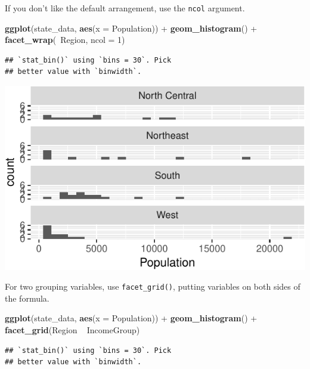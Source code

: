 \documentclass[12pt,oneside,openany]{tufte-book}
\newenvironment{Shaded}{}{}
\newcommand{\KeywordTok}[1]{\textcolor[rgb]{0.00,0.44,0.13}{\textbf{{#1}}}}
\newcommand{\DataTypeTok}[1]{\textcolor[rgb]{0.56,0.13,0.00}{{#1}}}
\newcommand{\DecValTok}[1]{\textcolor[rgb]{0.25,0.63,0.44}{{#1}}}
\newcommand{\StringTok}[1]{\textcolor[rgb]{0.25,0.44,0.63}{{#1}}}
\newcommand{\NormalTok}[1]{{#1}}
\begin{document}
If you don't like the default arrangement, use the \texttt{ncol}
argument.

\begin{Shaded}
\begin{Highlighting}[]
\KeywordTok{ggplot}\NormalTok{(state_data, }\KeywordTok{aes}\NormalTok{(}\DataTypeTok{x =} \NormalTok{Population)) +}\StringTok{ }\KeywordTok{geom_histogram}\NormalTok{() +}\StringTok{ }
\StringTok{    }\KeywordTok{facet_wrap}\NormalTok{(~Region, }\DataTypeTok{ncol =} \DecValTok{1}\NormalTok{)}
\end{Highlighting}
\end{Shaded}

\begin{verbatim}
## `stat_bin()` using `bins = 30`. Pick
## better value with `binwidth`.
\end{verbatim}

\includegraphics{pdaps_files/figure-latex/facet-wrap-ncol-1}

For two grouping variables, use \texttt{facet\_grid()}, putting
variables on both sides of the formula.

\begin{Shaded}
\begin{Highlighting}[]
\KeywordTok{ggplot}\NormalTok{(state_data, }\KeywordTok{aes}\NormalTok{(}\DataTypeTok{x =} \NormalTok{Population)) +}\StringTok{ }\KeywordTok{geom_histogram}\NormalTok{() +}\StringTok{ }
\StringTok{    }\KeywordTok{facet_grid}\NormalTok{(Region ~}\StringTok{ }\NormalTok{IncomeGroup)}
\end{Highlighting}
\end{Shaded}

\begin{verbatim}
## `stat_bin()` using `bins = 30`. Pick
## better value with `binwidth`.
\end{verbatim}
\end{document}
